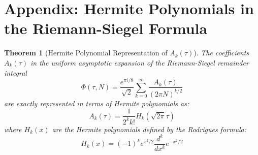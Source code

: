 \documentclass{article}
\newtheorem{theorem}{Theorem}
\begin{document}
\section*{Appendix: Hermite Polynomials in the Riemann-Siegel Formula}

\begin{theorem}[Hermite Polynomial Representation of $A_k(\tau)$]
The coefficients $A_k(\tau)$ in the uniform asymptotic expansion of the Riemann-Siegel remainder integral
\[
\Phi(\tau, N) = \frac{e^{\pi i/8}}{\sqrt{2}} \sum_{k=0}^{\infty} \frac{A_k(\tau)}{(2\pi N)^{k/2}}
\]
are exactly represented in terms of Hermite polynomials as:
\[
A_k(\tau) = \frac{1}{2^k k!} H_k(\sqrt{2\pi}\tau)
\]
where $H_k(x)$ are the Hermite polynomials defined by the Rodrigues formula:
\[
H_k(x) = (-1)^k e^{x^2/2} \frac{d^k}{dx^k} e^{-x^2/2}
\]
\end{theorem}
\end{document}
